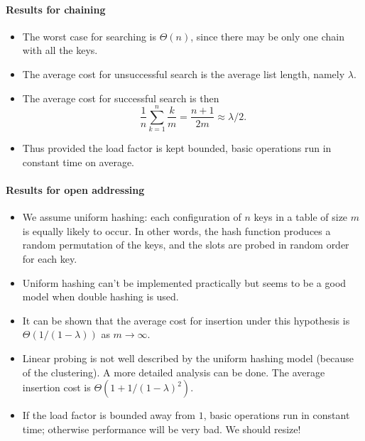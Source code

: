 % 


\paragraph{Results for chaining}
\begin{itemize}
\item The worst case for searching is $\Theta(n)$, since there may be only one 
chain with all the keys.
\item The average cost for unsuccessful search is the average list length, 
namely $\lambda$.
\item The average cost for successful search is then 
$$
\frac{1}{n} \sum_{k=1}^n \frac{k}{m} = \frac{n+1}{2m} \approx \lambda/2.
$$
\item Thus provided the load factor is kept bounded, basic operations run in 
constant time on average. 
\end{itemize}

\paragraph{Results for open addressing}
\begin{itemize}
\item We assume \alert{uniform hashing}: each configuration of 
$n$ keys in a table of size $m$ is equally likely to occur. In other words, the 
hash function produces a random permutation of the keys, and the slots are 
probed in random order for each key.
\item Uniform hashing can't be implemented practically but seems to be a good 
model when double hashing is used.
\item It can be shown that the average cost for insertion under this 
hypothesis is $\Theta(1/(1-\lambda))$ as $m \to \infty$. 
\item Linear probing is not well described by the uniform hashing model 
(because of the clustering). A more detailed analysis can be done. 
The average insertion cost is $\Theta(1 + 1/(1 - \lambda)^2)$.
\item If the load factor is bounded away from $1$, basic operations 
run in constant time; otherwise performance will be very bad. We should resize!
\end{itemize}

